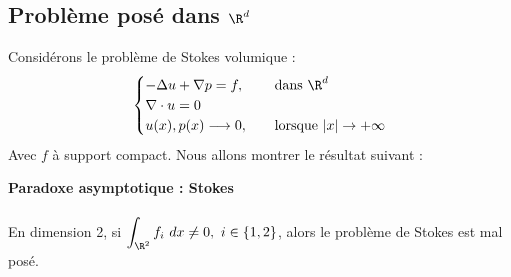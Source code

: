 \subsection{Problème posé dans $\R^d$}

Considérons le problème de Stokes volumique :
\begin{align}
    \begin{cases}
            -\Delta u + \nabla p = f, \quad &\text{ dans } \R^d \\ \label{stokes_volumique}
            \nabla \cdot u = 0 \\
            u(x),p(x) \longrightarrow 0, &\text{ lorsque } |x| \to +\infty
        \end{cases}
\end{align}
Avec $f$ à support compact. Nous allons montrer le résultat suivant :
\begin{propositionbox}
    \begin{proposition}\textbf{Paradoxe asymptotique : Stokes}\\
        \\
        En dimension 2, si $\displaystyle \int_{\R^2} f_i \ dx \neq 0, \ i \in \{1,2\}$, alors le problème de Stokes est mal posé.
    \end{proposition}
\end{propositionbox}
